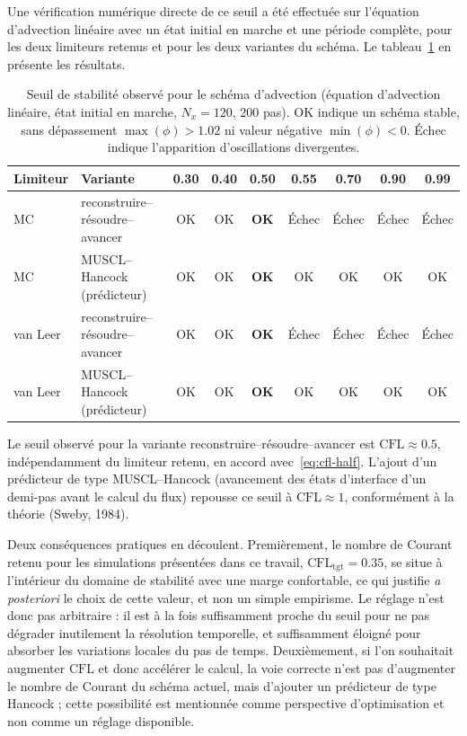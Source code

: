 \documentclass[11pt,a4paper]{report}
\begin{document}
Une vérification numérique directe de ce seuil a été effectuée sur l'équation d'advection linéaire avec un
état initial en marche et une période complète, pour les deux limiteurs retenus et pour les deux variantes
du schéma. Le tableau~\ref{tab:seuil-cfl} en présente les résultats.

\begin{table}[H]
\centering
\caption{Seuil de stabilité observé pour le schéma d'advection (équation d'advection linéaire, état
initial en marche, \(N_x = 120\), 200 pas). \og OK \fg{} indique un schéma stable, sans dépassement
\(\max(\phi) > 1.02\) ni valeur négative \(\min(\phi) < 0\). \og Échec \fg{} indique l'apparition
d'oscillations divergentes.}
\label{tab:seuil-cfl}
\small
\begin{tabular}{llccccccc}
\toprule
Limiteur & Variante & 0.30 & 0.40 & \textbf{0.50} & 0.55 & 0.70 & 0.90 & 0.99 \\
\midrule
MC & reconstruire--résoudre--avancer & OK & OK & \textbf{OK} & Échec & Échec & Échec & Échec \\
MC & MUSCL--Hancock (prédicteur) & OK & OK & \textbf{OK} & OK & OK & OK & OK \\
van Leer & reconstruire--résoudre--avancer & OK & OK & \textbf{OK} & Échec & Échec & Échec & Échec \\
van Leer & MUSCL--Hancock (prédicteur) & OK & OK & \textbf{OK} & OK & OK & OK & OK \\
\bottomrule
\end{tabular}
\begin{tablenotes}
\small
\item Le seuil observé pour la variante reconstruire--résoudre--avancer est
\(\mathrm{CFL} \approx 0.5\), indépendamment du limiteur retenu, en accord avec~\eqref{eq:cfl-half}.
L'ajout d'un prédicteur de type MUSCL--Hancock (avancement des états d'interface d'un demi-pas avant le
calcul du flux) repousse ce seuil à \(\mathrm{CFL} \approx 1\), conformément à la théorie
(Sweby, 1984).
\end{tablenotes}
\end{table}

Deux conséquences pratiques en découlent. Premièrement, le nombre de Courant retenu pour les simulations
présentées dans ce travail, \(\mathrm{CFL}_{\mathrm{tgt}} = 0.35\), se situe à l'intérieur du domaine de
stabilité avec une marge confortable, ce qui justifie \emph{a posteriori} le choix de cette valeur, et non
un simple empirisme. Le réglage n'est donc pas arbitraire : il est à la fois suffisamment proche du seuil
pour ne pas dégrader inutilement la résolution temporelle, et suffisamment éloigné pour absorber les
variations locales du pas de temps. Deuxièmement, si l'on souhaitait augmenter \(\mathrm{CFL}\) et donc
accélérer le calcul, la voie correcte n'est pas d'augmenter le nombre de Courant du schéma actuel, mais
d'ajouter un prédicteur de type Hancock ; cette possibilité est mentionnée comme perspective
d'optimisation et non comme un réglage disponible.
\end{document}
